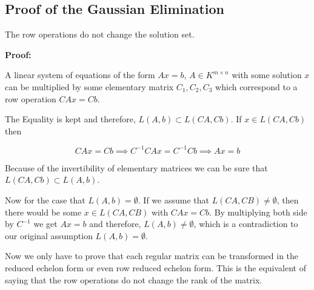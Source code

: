\bigskip


\subsection{Proof of the Gaussian Elimination}

The row operations do not change the solution set. 

\textbf{Proof:}

A linear system of equations of the form \(Ax = b\), \(A \in K^{m \times n}\) with some solution
\(x\) can be multiplied by some elementary matrix \(C_1, C_2, C_3\) which correspond to a row 
operation \(CAx = Cb\).

The Equality is kept and therefore, \(L(A,b) \subset L(CA, Cb)\). If \(x \in L(CA, Cb)\) then

\[
	CAx = Cb \implies C^{-1}CAx = C^{-1}Cb \implies Ax = b
\]

Because of the invertibility of elementary matrices we can be sure that  \(L(CA, Cb) \subset L(A,b) \).

Now for the case that \(L(A,b) = \emptyset\). If we assume that \(L(CA,CB) \ne \emptyset \), then 
there would be some \(x \in L(CA,CB)\) with \(CAx = Cb\). By multiplying both side by \(C^{-1}\) we 
get \(Ax = b\) and therefore, \(L(A, b) \ne \emptyset \),  which is a contradiction to our original
assumption  \(L(A,b) = \emptyset\).

\QED

Now we only have to prove that each regular matrix can be transformed in the reduced echelon form or 
even row reduced echelon form. This is the equivalent of saying that the row operations do not change
the rank of the matrix.

